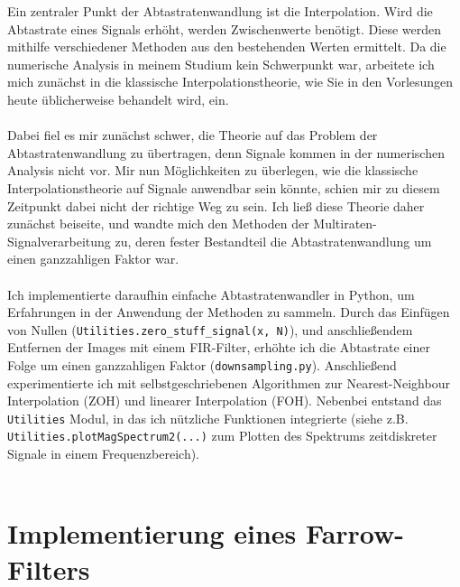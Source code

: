 \documentclass[11pt]{article}
\newcommand{\code}[1] {\texttt{#1}}
\begin{document}
Ein zentraler Punkt der Abtastratenwandlung ist die Interpolation. Wird die Abtastrate eines Signals erhöht, werden Zwischenwerte benötigt. Diese werden mithilfe verschiedener Methoden aus den bestehenden Werten ermittelt. Da die numerische Analysis in meinem Studium kein Schwerpunkt war, arbeitete ich mich zunächst in die klassische Interpolationstheorie, wie Sie in den Vorlesungen heute üblicherweise behandelt wird, ein. \\
\\
Dabei fiel es mir zunächst schwer, die Theorie auf das Problem der Abtastratenwandlung zu übertragen, denn Signale kommen in der numerischen Analysis nicht vor. Mir nun Möglichkeiten zu überlegen, wie die klassische Interpolationstheorie auf Signale anwendbar sein könnte, schien mir zu diesem Zeitpunkt dabei nicht der richtige Weg zu sein. Ich ließ diese Theorie daher zunächst beiseite, und wandte mich den Methoden der Multiraten-Signalverarbeitung zu, deren fester Bestandteil die Abtastratenwandlung um einen ganzzahligen Faktor war. \\
\\
Ich implementierte daraufhin einfache Abtastratenwandler in Python, um Erfahrungen in der Anwendung der Methoden zu sammeln. Durch das Einfügen von Nullen (\code{Utilities.zero\_stuff\_signal(x, N)}), und anschließendem Entfernen der Images mit einem FIR-Filter, erhöhte ich die Abtastrate einer Folge um einen ganzzahligen Faktor (\code{downsampling.py}). Anschließend experimentierte ich mit selbstgeschriebenen Algorithmen zur Nearest-Neighbour Interpolation (ZOH) und linearer Interpolation (FOH). Nebenbei entstand das \code{Utilities} Modul, in das ich nützliche Funktionen integrierte (siehe z.B. \code{Utilities.plotMagSpectrum2(...)} zum Plotten des Spektrums zeitdiskreter Signale in einem Frequenzbereich).\\
\\

\section{Implementierung eines Farrow-Filters}
\end{document}
